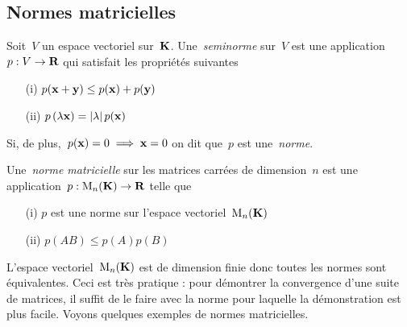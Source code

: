 \clearpage
\subsection{Normes matricielles}


\begin{definition}[norme]
	Soit~$V$ un espace vectoriel sur~$\mathbf{K}$.
	Une~\emph{seminorme} sur~$V$ est une application~$p:V\to\mathbf{R}$
	qui satisfait les propriétés suivantes
	\begin{enumerate}
		\item[(i)] $p(\mathbf{x}+\mathbf{y})\le p(\mathbf{x})+p(\mathbf{y})$
		\item[(ii)] $p\left(\lambda\mathbf{x}\right)=\left|\lambda\right|p(\mathbf{x})$
	\end{enumerate}
	Si, de plus,~$p(\mathbf{x})=0\implies\mathbf{x}=0$ on dit que~$p$ est une~\emph{norme}.
\end{definition}

\begin{definition}
	Une~\emph{norme matricielle} sur les matrices carrées de dimension~$n$ est
	une application~$p:\mathrm{M}_n(\mathbf{K})\to\mathbf{R}$ telle que
	\begin{enumerate}
		\item[(i)] $p$ est une norme sur l'espace vectoriel~$\mathrm{M}_n(\mathbf{K})$
		\item[(ii)] $p(AB) \le p(A) p(B)$
	\end{enumerate}
\end{definition}

L'espace vectoriel~$\mathrm{M}_n(\mathbf{K})$ est de dimension finie donc toutes les normes
sont équivalentes.  Ceci est très pratique : pour démontrer la convergence
d'une suite de matrices, il suffit de le faire avec la norme pour laquelle la
démonstration est plus facile.  Voyons quelques exemples de normes
matricielles.

